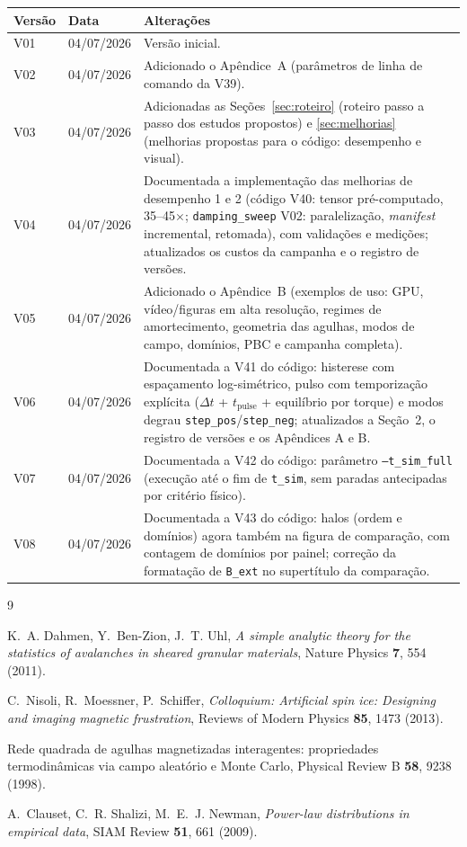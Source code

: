 \documentclass[11pt,a4paper]{article}
\newcommand{\code}[1]{\texttt{#1}}
\begin{document}
\begin{tabular}{@{}lll@{}}
\toprule
\textbf{Versão} & \textbf{Data} & \textbf{Alterações} \\
\midrule
V01 & 04/07/2026 & Versão inicial. \\
V02 & 04/07/2026 & Adicionado o Apêndice~A (parâmetros de linha de
comando da V39). \\
V03 & 04/07/2026 & Adicionadas as Seções~\ref{sec:roteiro} (roteiro
passo a passo dos estudos propostos) e \ref{sec:melhorias} (melhorias
propostas para o código: desempenho e visual). \\
V04 & 04/07/2026 & Documentada a implementação das melhorias de
desempenho 1 e 2 (código V40: tensor pré-computado, 35--45$\times$;
\code{damping\_sweep} V02: paralelização, \emph{manifest} incremental,
retomada), com validações e medições; atualizados os custos da campanha
e o registro de versões. \\
V05 & 04/07/2026 & Adicionado o Apêndice~B (exemplos de uso: GPU,
vídeo/figuras em alta resolução, regimes de amortecimento, geometria das
agulhas, modos de campo, domínios, PBC e campanha completa). \\
V06 & 04/07/2026 & Documentada a V41 do código: histerese com
espaçamento log-simétrico, pulso com temporização explícita
($\Delta t$ + $t_{\mathrm{pulse}}$ + equilíbrio por torque) e modos
degrau \code{step\_pos}/\code{step\_neg}; atualizados a Seção~2, o
registro de versões e os Apêndices A e B. \\
V07 & 04/07/2026 & Documentada a V42 do código: parâmetro
\code{--t\_sim\_full} (execução até o fim de \code{t\_sim}, sem paradas
antecipadas por critério físico). \\
V08 & 04/07/2026 & Documentada a V43 do código: halos (ordem e
domínios) agora também na figura de comparação, com contagem de
domínios por painel; correção da formatação de \code{B\_ext} no
supertítulo da comparação. \\
\bottomrule
\end{tabular}

\begin{thebibliography}{9}

K.~A. Dahmen, Y.~Ben-Zion, J.~T. Uhl,
\emph{A simple analytic theory for the statistics of avalanches in
sheared granular materials},
Nature Physics \textbf{7}, 554 (2011).

C.~Nisoli, R.~Moessner, P.~Schiffer,
\emph{Colloquium: Artificial spin ice: Designing and imaging magnetic
frustration},
Reviews of Modern Physics \textbf{85}, 1473 (2013).

Rede quadrada de agulhas magnetizadas interagentes: propriedades
termodinâmicas via campo aleatório e Monte Carlo,
Physical Review B \textbf{58}, 9238 (1998).

A.~Clauset, C.~R. Shalizi, M.~E.~J. Newman,
\emph{Power-law distributions in empirical data},
SIAM Review \textbf{51}, 661 (2009).

\end{thebibliography}
\end{document}
